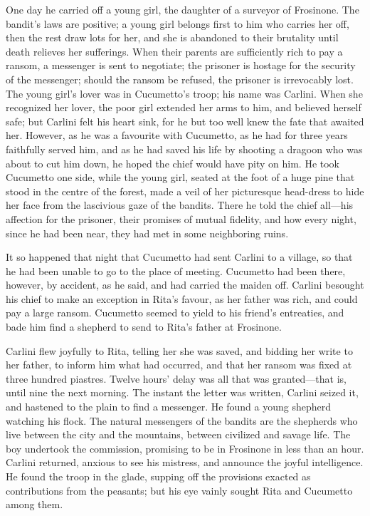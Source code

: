 {One day he carried off a young girl, the daughter of a surveyor of Frosinone. The bandit's laws are positive; a young girl belongs first to him who carries her off, then the rest draw lots for her, and she is abandoned to their brutality until death relieves her sufferings. When their parents are sufficiently rich to pay a ransom, a messenger is sent to negotiate; the prisoner is hostage for the security of the messenger; should the ransom be refused, the prisoner is irrevocably lost. The young girl's lover was in Cucumetto's troop; his name was Carlini. When she recognized her lover, the poor girl extended her arms to him, and believed herself safe; but Carlini felt his heart sink, for he but too well knew the fate that awaited her. However, as he was a favourite with Cucumetto, as he had for three years faithfully served him, and as he had saved his life by shooting a dragoon who was about to cut him down, he hoped the chief would have pity on him. He took Cucumetto one side, while the young girl, seated at the foot of a huge pine that stood in the centre of the forest, made a veil of her picturesque head-dress to hide her face from the lascivious gaze of the bandits. There he told the chief all—his affection for the prisoner, their promises of mutual fidelity, and how every night, since he had been near, they had met in some neighboring ruins.  

It so happened that night that Cucumetto had sent Carlini to a village, so that he had been unable to go to the place of meeting. Cucumetto had been there, however, by accident, as he said, and had carried the maiden off. Carlini besought his chief to make an exception in Rita's favour, as her father was rich, and could pay a large ransom. Cucumetto seemed to yield to his friend's entreaties, and bade him find a shepherd to send to Rita's father at Frosinone. 

Carlini flew joyfully to Rita, telling her she was saved, and bidding her write to her father, to inform him what had occurred, and that her ransom was fixed at three hundred piastres. Twelve hours' delay was all that was granted—that is, until nine the next morning. The instant the letter was written, Carlini seized it, and hastened to the plain to find a messenger. He found a young shepherd watching his flock. The natural messengers of the bandits are the shepherds who live between the city and the mountains, between civilized and savage life. The boy undertook the commission, promising to be in Frosinone in less than an hour. Carlini returned, anxious to see his mistress, and announce the joyful intelligence. He found the troop in the glade, supping off the provisions exacted as contributions from the peasants; but his eye vainly sought Rita and Cucumetto among them. 

}
